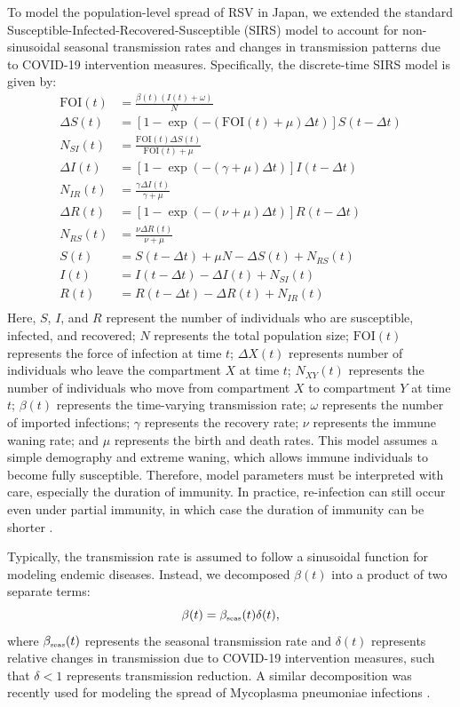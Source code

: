 \documentclass[12pt]{article}
\newcommand{\tsub}[2]{#1_{{\textrm{\tiny #2}}}}
\begin{document}
To model the population-level spread of RSV in Japan, we extended the standard Susceptible-Infected-Recovered-Susceptible (SIRS) model to account for non-sinusoidal seasonal transmission rates and changes in transmission patterns due to COVID-19 intervention measures.
Specifically, the discrete-time SIRS model is given by:
\begin{align}
\mathrm{FOI}(t) &= \frac{\beta(t) (I(t) + \omega)}{N}\\
\Delta S(t) &= \left[1- \exp(-(\mathrm{FOI}(t) + \mu) \Delta t )\right] S(t-\Delta t)\\
N_{SI}(t) &= \frac{\mathrm{FOI}(t)\Delta S(t)}{\mathrm{FOI}(t) + \mu} \\
\Delta I(t) &= \left[1- \exp(-(\gamma + \mu) \Delta t )\right] I(t-\Delta t)\\
N_{IR}(t) &= \frac{\gamma \Delta I(t)}{\gamma + \mu} \\
\Delta R(t) &= \left[1- \exp(-(\nu + \mu) \Delta t )\right] R(t-\Delta t)\\
N_{RS}(t) &= \frac{\nu \Delta R(t)}{\nu + \mu} \\
S(t) &= S(t-\Delta t) + \mu N - \Delta S(t) + N_{RS}(t)  \\
I(t) &= I(t-\Delta t) - \Delta I(t) + N_{SI}(t)  \\
R(t) &= R(t-\Delta t) - \Delta R(t) + N_{IR}(t)  \\
\end{align}
Here, $S$, $I$, and $R$ represent the number of individuals who are susceptible, infected, and recovered;
$N$ represents the total population size;
$\mathrm{FOI}(t)$ represents the force of infection at time $t$;
$\Delta X(t)$ represents number of individuals who leave the compartment $X$ at time $t$;
$N_{XY}(t)$ represents the number of individuals who move from compartment $X$ to compartment $Y$ at time $t$;
$\beta(t)$ represents the time-varying transmission rate;
$\omega$ represents the number of imported infections;
$\gamma$ represents the recovery rate;
$\nu$ represents the immune waning rate;
and $\mu$ represents the birth and death rates.
This model assumes a simple demography and extreme waning, which allows immune individuals to become fully susceptible.
Therefore, model parameters must be interpreted with care, especially the duration of immunity.
In practice, re-infection can still occur even under partial immunity, in which case the duration of immunity can be shorter \citep{pitzer2015environmental}.

Typically, the transmission rate is assumed to follow a sinusoidal function for modeling endemic diseases.
Instead, we decomposed $\beta(t)$ into a product of two separate terms:
\begin{equation}
\beta(t) = \tsub{\beta}{seas}(t) \delta(t),
\end{equation}
where $\tsub{\beta}{seas}(t)$ represents the seasonal transmission rate and $\delta(t)$ represents relative changes in transmission due to COVID-19 intervention measures, such that $\delta < 1$ represents transmission reduction.
A similar decomposition was recently used for modeling the spread of Mycoplasma pneumoniae infections \citep{park2024myco}.
\end{document}
